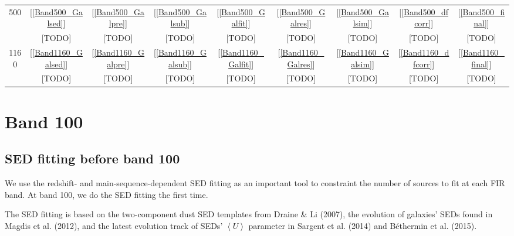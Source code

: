 \documentclass[11pt,a4paper]{article}
\begin{document}
\begin{table}[h]
\begin{tabular}{ccccccccc}
		500 & [\ref{Band500_Galsed}] & [\ref{Band500_Galpre}] & [\ref{Band500_Galsub}] & [\ref{Band500_Galfit}] & [\ref{Band500_Galres}] & [\ref{Band500_Galsim}] & [\ref{Band500_dfcorr}] & [\ref{Band500_final}] \\
		& \textcolor{red!50!black}{[TODO]} & \textcolor{red!50!black}{[TODO]} & \textcolor{red!50!black}{[TODO]} & \textcolor{red!50!black}{[TODO]} & \textcolor{red!50!black}{[TODO]} & \textcolor{red!50!black}{[TODO]} & \textcolor{red!50!black}{[TODO]} & \textcolor{red!50!black}{[TODO]} \\
		1160 & [\ref{Band1160_Galsed}] & [\ref{Band1160_Galpre}] & [\ref{Band1160_Galsub}] & [\ref{Band1160_Galfit}] & [\ref{Band1160_Galres}] & [\ref{Band1160_Galsim}] & [\ref{Band1160_dfcorr}] & [\ref{Band1160_final}] \\
		& \textcolor{red!50!black}{[TODO]} & \textcolor{red!50!black}{[TODO]} & \textcolor{red!50!black}{[TODO]} & \textcolor{red!50!black}{[TODO]} & \textcolor{red!50!black}{[TODO]} & \textcolor{red!50!black}{[TODO]} & \textcolor{red!50!black}{[TODO]} & \textcolor{red!50!black}{[TODO]} \\
		\hline
	\end{tabular}
\end{table}


\clearpage

\section{Band 100}

\subsection{SED fitting before band 100}
\label{Band100_Galsed}

We use the redshift- and main-sequence-dependent SED fitting as an important tool to constraint the number of sources to fit at each FIR band. At band 100, we do the SED fitting the first time. 

The SED fitting is based on the two-component dust SED templates from Draine \& Li (2007), the evolution of galaxies' SEDs found in Magdis et al. (2012), and the latest evolution track of SEDs' $\left<U\right>$ parameter in Sargent et al. (2014) and B\'{e}thermin et al. (2015). 
\end{document}
